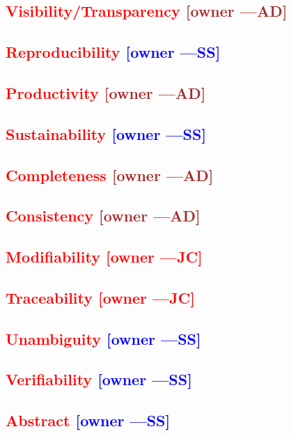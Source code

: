 \documentclass[letterpaper,cleveref]{lipics-v2019}
\newcommand{\authornote}[3]{\textcolor{#1}{[#3 ---#2]}}
\newcommand{\authornote}[3]{}
\newcommand{\wss}[1]{\authornote{blue}{SS}{#1}} %
\newcommand{\jc}[1]{\authornote{red}{JC}{#1}} %
\newcommand{\ad}[1]{\authornote{brown}{AD}{#1}} %
\newcommand{\notdone}[1]{\textcolor{red}{#1}}
\theoremstyle{definition}
\begin{document}
\subsection{\notdone{Visibility/Transparency} \ad{owner}}

\subsection{\notdone{Reproducibility} \wss{owner}}

\subsection{\notdone{Productivity} \ad{owner}}

\subsection{\notdone{Sustainability} \wss{owner}}

\subsection{\notdone{Completeness} \ad{owner}}

\subsection{\notdone{Consistency} \ad{owner}}

\subsection{\notdone{Modifiability} \jc{owner}}

\subsection{\notdone{Traceability} \jc{owner}}

\subsection{\notdone{Unambiguity} \wss{owner}}

\subsection{\notdone{Verifiability} \wss{owner}}

\subsection{\notdone{Abstract} \wss{owner}}
\end{document}
